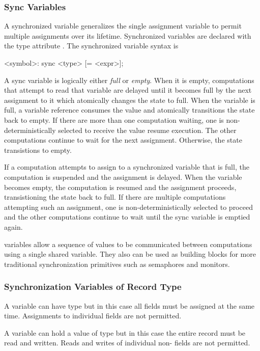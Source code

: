 \subsubsection{Sync Variables}
\label{Sync_Variables}

A synchronized variable generalizes the single assignment variable to
permit multiple assignments over its lifetime. Synchronized variables
are declared with the type attribute . The synchronized
variable syntax is
\begin{chapel}
[var] <symbol>: sync <type> [= <expr>];
\end{chapel}
A sync variable is logically either {\em full} or {\em empty}. When it
is empty, computations that attempt to read that variable are delayed
until it becomes full by the next assignment to it which atomically
changes the state to full. When the variable is full, a variable
reference consumes the value and atomically transitions the state back
to empty. If there are more than one computation waiting, one is
non-deterministically selected to receive the value resume execution.
The other computations continue to wait for the next
assignment. Otherwise, the state transistions to empty. 

If a computation attempts to assign to a synchronized variable that is
full, the computation is suspended and the assignment is delayed. When
the variable becomes empty, the computation is resumed and the
assignment proceeds, transistioning the state back to full. If there
are multiple computations attempting such an assignment, one is
non-deterministically selected to proceed and the other computations
continue to wait until the sync variable is emptied again.

 variables allow a sequence of values to be communicated
between computations using a single shared variable. They also can be
used as building blocks for more traditional synchronization
primitives such as semaphores and monitors.

\subsubsection{Synchronization Variables of Record Type}
\label{Synchronization_Variables_of_Record_Type}

A  variable can have  type but in this case
all fields must be assigned at the same time. Assignments to
individual fields are not permitted.

A  variable can hold a value of  type but in
this case the entire record must be read and written. Reads and writes
of individual non- fields are not permitted.



